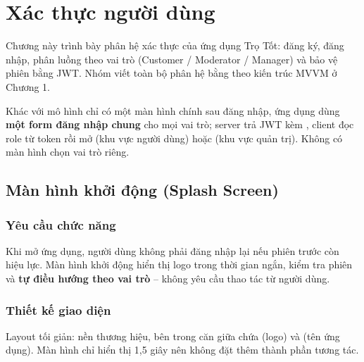 
\chapter{Xác thực người dùng}

Chương này trình bày phân hệ xác thực của ứng dụng Trọ Tốt: đăng ký, đăng
nhập, phân luồng theo vai trò (Customer / Moderator / Manager) và bảo vệ
phiên bằng JWT. Nhóm viết toàn bộ phân hệ bằng  theo kiến trúc
MVVM ở Chương 1.

Khác với mô hình chỉ có một màn hình chính sau đăng nhập, ứng dụng dùng
\textbf{một form đăng nhập chung} cho mọi vai trò; server trả JWT kèm
, client đọc role từ token rồi mở 
(khu vực người dùng) hoặc  (khu vực quản trị). Không
có màn hình chọn vai trò riêng.

\section{Màn hình khởi động (Splash Screen)}

\subsection{Yêu cầu chức năng}
Khi mở ứng dụng, người dùng không phải đăng nhập lại nếu phiên trước còn
hiệu lực. Màn hình khởi động hiển thị logo trong thời gian ngắn, kiểm tra
phiên và \textbf{tự điều hướng theo vai trò} -- không yêu cầu thao tác từ
người dùng.

\subsection{Thiết kế giao diện}
Layout  tối giản:  nền thương
hiệu, bên trong  căn giữa chứa  (logo)
và  (tên ứng dụng). Màn hình chỉ hiển thị 1,5 giây nên không
đặt thêm thành phần tương tác.

